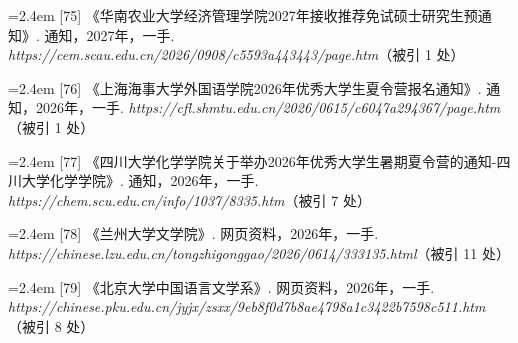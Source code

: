 {\vspace{0.6pt}
\vspace{3.5pt}\par
\nopagebreak\vspace{1pt}
\noindent\hangindent=2.4em \label{src:S0087}{\color{cAccent}[75]} 《华南农业大学经济管理学院2027年接收推荐免试硕士研究生预通知》. 通知，2027年，一手. \textit{https://cem.scau.edu.cn/2026/0908/c5593a443443/page.htm}（被引 1 处）\par
\vspace{0.6pt}
\vspace{3.5pt}\par
\nopagebreak\vspace{1pt}
\noindent\hangindent=2.4em \label{src:S0088}{\color{cAccent}[76]} 《上海海事大学外国语学院2026年优秀大学生夏令营报名通知》. 通知，2026年，一手. \textit{https://cfl.shmtu.edu.cn/2026/0615/c6047a294367/page.htm}（被引 1 处）\par
\vspace{0.6pt}
\vspace{3.5pt}\par
\nopagebreak\vspace{1pt}
\noindent\hangindent=2.4em \label{src:S0091}{\color{cAccent}[77]} 《四川大学化学学院关于举办2026年优秀大学生暑期夏令营的通知-四川大学化学学院》. 通知，2026年，一手. \textit{https://chem.scu.edu.cn/info/1037/8335.htm}（被引 7 处）\par
\vspace{0.6pt}
\vspace{3.5pt}\par
\nopagebreak\vspace{1pt}
\noindent\hangindent=2.4em \label{src:S0094}{\color{cAccent}[78]} 《兰州大学文学院》. 网页资料，2026年，一手. \textit{https://chinese.lzu.edu.cn/tongzhigonggao/2026/0614/333135.html}（被引 11 处）\par
\vspace{0.6pt}
\vspace{3.5pt}\par
\nopagebreak\vspace{1pt}
\noindent\hangindent=2.4em \label{src:S0095}{\color{cAccent}[79]} 《北京大学中国语言文学系》. 网页资料，2026年，一手. \textit{https://chinese.pku.edu.cn/jyjx/zsxx/9eb8f0d7b8ae4798a1c3422b7598c511.htm}（被引 8 处）\par
}
